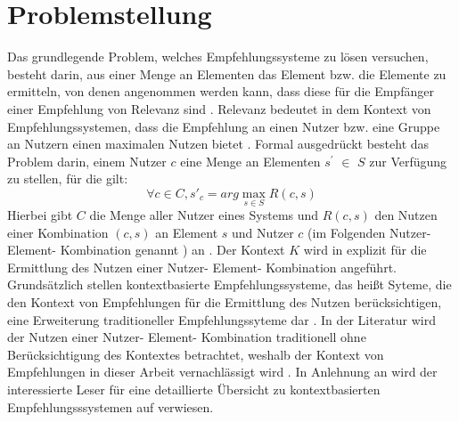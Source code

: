 \section{Problemstellung}
\label{ch:empfehlungssysteme:problemstellung}
Das grundlegende Problem, welches Empfehlungssysteme zu lösen versuchen, besteht darin, aus einer Menge an Elementen das Element bzw. die Elemente zu ermitteln, von denen angenommen werden kann, dass diese für die Empfänger einer Empfehlung von Relevanz sind \cite[S. 734f]{adomavicius:inproceedings}\cite[S. 76]{jannach:inproceedings}.
Relevanz bedeutet in dem Kontext von Empfehlungssystemen, dass die Empfehlung an einen Nutzer bzw. eine Gruppe an Nutzern einen maximalen Nutzen bietet \cite[S. 49]{adomavicius:inproceedings:2}\cite[S. 219]{lakiotaki:inproceedings}.
Formal ausgedrückt besteht das Problem darin, einem Nutzer $c$ eine Menge an Elementen $s^{'}$ $\in$ $S$ zur Verfügung zu stellen, für die gilt:
\begin{equation}\label{eq1}
    \forall c\in C,  s'_c = arg\max_{s \in S} R(c,s)
\end{equation}
Hierbei gibt $C$ die Menge aller Nutzer eines Systems und $R(c,s)$ den Nutzen einer Kombination $(c,s)$ an Element $s$ und Nutzer $c$ (im Folgenden Nutzer- Element- Kombination genannt \cite[S. 3]{recommenderSystems:2016}) an \cite[S. 734f]{adomavicius:inproceedings}\cite[S. 219]{lakiotaki:inproceedings}.
Der Kontext $K$ wird in \textcite[S. 1]{klahold:book} explizit für die Ermittlung des Nutzen einer Nutzer- Element- Kombination angeführt.
Grundsätzlich stellen kontextbasierte Empfehlungssysteme, das heißt Syteme, die den Kontext von Empfehlungen für die Ermittlung des Nutzen berücksichtigen, eine Erweiterung traditioneller Empfehlungssyteme dar \cite[S. 744ff]{adomavicius:inproceedings}.
In der Literatur wird der Nutzen einer Nutzer- Element- Kombination traditionell ohne Berücksichtigung des Kontextes betrachtet, weshalb der Kontext von Empfehlungen in dieser Arbeit vernachlässigt wird \cite[S. 734f]{adomavicius:inproceedings}\cite[S. 219]{lakiotaki:inproceedings}\cite[S. 3]{jawaheer:article}.
In Anlehnung an \textcite[S. 3]{jawaheer:article} wird der interessierte Leser für eine detaillierte Übersicht zu kontextbasierten Empfehlungsssystemen auf \textcite[S. 191ff]{ricci:book} verwiesen.

